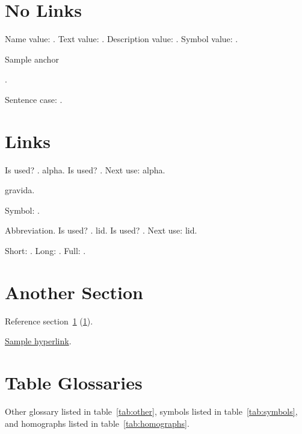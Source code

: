 \documentclass[draft]{article}
\begin{document}
\tableofcontents

\printunsrtglossary

\section{No Links}
\label{sec:nolinks}
Name value: .
Text value: .
Description value: .
Symbol value: .

\hypertarget{sampleanchor}{Sample anchor}.

Sentence case: .

\section{Links}
\label{sec:links}

Is used? .
\gls{alpha}.
Is used? .
Next use: \gls{alpha}.

\Gls{gravida}.

Symbol: .

Abbreviation. 
Is used? .
\gls{lid}.
Is used? .
Next use: \gls{lid}.

Short: .
Long: .
Full: .

\section{Another Section}
\label{sec:another}

Reference section~\ref{sec:nolinks} (\ref*{sec:nolinks}).

\hyperlink{sampleanchor}{Sample hyperlink}.

\lipsum

\section{Table Glossaries}
\label{sec:table}

Other glossary listed in table~\ref{tab:other},
symbols listed in table~\ref{tab:symbols},
and homographs listed in table~\ref{tab:homographs}.

\printunsrttable[label={tab:other},type=other,
 block-style=name,par=ragged,other=useri]

\printunsrttable[label={tab:symbols},type=symbols,
 block-style=name-symbol-desc,par=ragged]

\printunsrttable[label={tab:homographs},type=homographs,
 block-style=name-desc,par=ragged]
\end{document}
